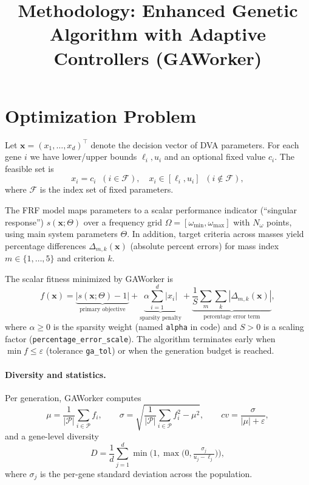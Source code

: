 \documentclass[12pt,a4paper]{article}
\title{Methodology: Enhanced Genetic Algorithm with Adaptive Controllers (GAWorker)}
\date{}
\begin{document}
\maketitle

\section{Optimization Problem}
Let $\bm{x} = (x_1,\ldots,x_d)^\top$ denote the decision vector of DVA parameters. For each gene $i$ we have lower/upper bounds $\ell_i, u_i$ and an optional fixed value $c_i$. The feasible set is
\[ x_i = c_i \;\; (i \in \mathcal{F}) , \quad x_i \in [\ell_i,u_i] \;\; (i \notin \mathcal{F}) , \]
where $\mathcal{F}$ is the index set of fixed parameters.

The FRF model maps parameters to a scalar performance indicator (``singular response'') $s(\bm{x};\Theta)$ over a frequency grid $\Omega=[\omega_{\min},\omega_{\max}]$ with $N_\omega$ points, using main system parameters $\Theta$. In addition, target criteria across masses yield percentage differences $\Delta_{m,k}(\bm{x})$ (absolute percent errors) for mass index $m\in\{1,\ldots,5\}$ and criterion $k$.

The scalar fitness minimized by GAWorker is
\begin{equation}
\label{eq:fitness}
f(\bm{x}) = \underbrace{\left| s(\bm{x};\Theta) - 1\right|}_{\text{primary objective}} + \underbrace{\alpha \sum_{i=1}^{d} |x_i|}_{\text{sparsity penalty}} + \underbrace{\frac{1}{S} \sum_{m} \sum_{k} |\Delta_{m,k}(\bm{x})|}_{\text{percentage error term}},
\end{equation}
where $\alpha\ge 0$ is the sparsity weight (named \texttt{alpha} in code) and $S>0$ is a scaling factor (\texttt{percentage\_error\_scale}). The algorithm terminates early when $\min f \le \varepsilon$ (tolerance \texttt{ga\_tol}) or when the generation budget is reached.

\paragraph{Diversity and statistics.} Per generation, GAWorker computes
\[ \mu = \frac{1}{|\mathcal{P}|} \sum_{i\in \mathcal{P}} f_i, \qquad \sigma = \sqrt{\frac{1}{|\mathcal{P}|} \sum_{i\in \mathcal{P}} f_i^2 - \mu^2}, \qquad cv = \frac{\sigma}{|\mu|+\varepsilon}, \]
and a gene-level diversity
\[ D = \frac{1}{d} \sum_{j=1}^{d} \min\!\Big(1,\max\!\big(0, \tfrac{\sigma_j}{u_j-\ell_j}\big)\Big), \]
where $\sigma_j$ is the per-gene standard deviation across the population.
\end{document}
